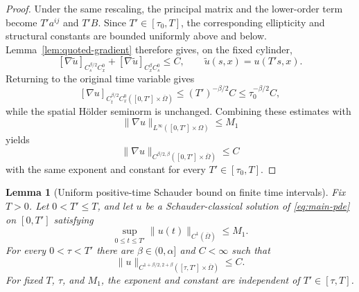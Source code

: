 \documentclass[11pt]{article}
\newtheorem{lemma}[theorem]{Lemma}
\theoremstyle{remark}
\begin{document}
\begin{proof}
Under the same rescaling, the principal matrix and the lower-order term
become $T'a^{ij}$ and $T'B$. Since $T'\in[\tau_0,T]$, the corresponding
ellipticity and structural constants are bounded uniformly above and
below. Lemma~\ref{lem:quoted-gradient} therefore gives, on the fixed
cylinder,
\[
[\nabla\widetilde{u}]_{C_s^{\beta/2}C_x^0}
+
[\nabla\widetilde{u}]_{C_x^\beta C_s^0}
\leq C,
\qquad
\widetilde{u}(s,x)=u(T's,x).
\]
Returning to the original time variable gives
\[
[\nabla u]_{C_t^{\beta/2}C_x^0
([0,T']\times\overline{\Omega})}
\leq
(T')^{-\beta/2}C
\leq
\tau_0^{-\beta/2}C,
\]
while the spatial H\"older seminorm is unchanged. Combining these
estimates with
\[
\|\nabla u\|_{L^\infty([0,T']\times\Omega)}
\leq M_1
\]
yields
\[
\|\nabla u\|_{C^{\beta/2,\beta}
([0,T']\times\overline{\Omega})}
\leq C
\]
with the same exponent and constant for every
$T'\in[\tau_0,T]$.
\end{proof}

\begin{lemma}[Uniform positive-time Schauder bound on finite time intervals]\label{lem:schauder}
Fix $T>0$. Let $0<T'\leq T$, and let $u$ be a
Schauder-classical solution of \eqref{eq:main-pde} on $[0,T']$ satisfying
\[
 \sup_{0\le t\le T'}\|u(t)\|_{C^1(\overline\Omega)}\le M_1.
\]
For every $0<\tau<T'$ there are $\beta\in(0,\alpha]$ and $C<\infty$ such that
\[
 \|u\|_{C^{1+\beta/2,2+\beta}([\tau,T']\times\overline\Omega)}\le C.
\]
For fixed $T$, $\tau$, and $M_1$, the exponent and constant are independent
of $T'\in[\tau,T]$.
\end{lemma}
\end{document}
